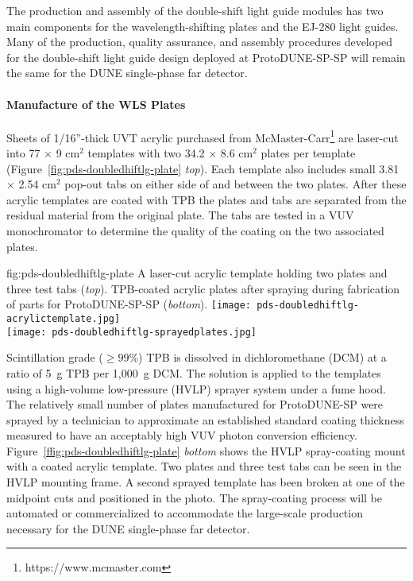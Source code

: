 The production and assembly of the double-shift light guide modules has two main components for the wavelength-shifting plates and the EJ-280 light guides. Many of the production, quality assurance, and assembly procedures developed for the double-shift light guide design deployed at ProtoDUNE-SP-SP will remain the same for the DUNE single-phase far detector.
																								
\paragraph*{Manufacture of the WLS Plates}

Sheets of 1/16''-thick UVT acrylic purchased from McMaster-Carr\footnote{https://www.mcmaster.com} are laser-cut into 77 $\times$ 9 cm$^2$ templates with two 34.2 $\times$ 8.6 cm$^2$ plates per template (Figure~\ref{fig:pds-doubledhiftlg-plate} {\it top}). Each template also includes small 3.81 $\times$ 2.54 cm$^2$ pop-out tabs on either side of and between the two plates. After these acrylic templates are coated with TPB the plates and tabs are separated from the residual material from the original plate. The tabs are tested in a VUV monochromator to determine the quality of the coating on the two associated plates.

\begin{dunefigure}
{fig:pds-doubledhiftlg-plate}
{A laser-cut acrylic template holding two plates and three test tabs ({\it top}). TPB-coated acrylic plates after spraying during fabrication of parts for ProtoDUNE-SP-SP ({\it bottom}).}
    \texttt{[image: pds-doubledhiftlg-acrylictemplate.jpg]}\\
    \texttt{[image: pds-doubledhiftlg-sprayedplates.jpg]}
\end{dunefigure}

Scintillation grade ($\ge 99$\%) TPB is dissolved in dichloromethane (DCM) at a ratio of 5~g TPB per 1,000~g DCM. The solution is applied to the templates using a high-volume low-pressure (HVLP) sprayer system under a fume hood. The relatively small number of plates manufactured for ProtoDUNE-SP were sprayed by a technician to approximate an established standard coating thickness measured to have an acceptably high VUV photon conversion efficiency. Figure~\ref{ffig:pds-doubledhiftlg-plate} {\it bottom} shows the HVLP spray-coating mount with a coated acrylic template. Two plates and three test tabs can be seen in the HVLP mounting frame. A second sprayed template has been broken at one of the midpoint cuts and positioned in the photo. The spray-coating process will be automated or commercialized to accommodate the large-scale production necessary for the DUNE single-phase far detector.

